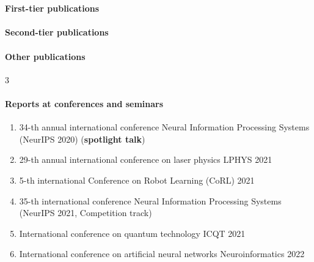 \section*{}

\paragraph{First-tier publications} 
\begin{refsection} 
    \nocite{confbib1}
    \printbibliography[heading=none]
\end{refsection}

\paragraph{Second-tier publications}
\begin{refsection} 
    \nocite{confbib4}
    \printbibliography[heading=none]
\end{refsection}

\paragraph{Other publications}
\begin{refsection} 
    \nocite{confbib2}
    \nocite{confbib3}
    \nocite{progbib1_en}
    \printbibliography[heading=none]
\end{refsection}

\expandafter\def\csname blx@maxbibnames\endcsname{3}%

\paragraph{Reports at conferences and seminars}
\begin{enumerate}[labelindent=3pt, labelsep=10pt, topsep=10pt, itemsep=5pt]
    \item 34-th annual international conference Neural Information Processing Systems (NeurIPS 2020) (\textbf{spotlight talk})
    \item 29-th annual international conference on laser physics LPHYS 2021
    \item 5-th international Conference on Robot Learning (CoRL) 2021
    \item 35-th international conference Neural Information Processing Systems (NeurIPS 2021, Competition track)
    \item International conference on quantum technology ICQT 2021
    \item International conference on artificial neural networks Neuroinformatics 2022
\end{enumerate}

